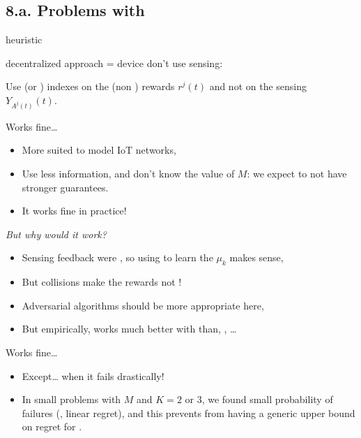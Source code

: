 \documentclass[12pt,english,ignorenonframetext,aspectratio=169,]{beamer}
\providecommand{\tightlist}{%
  \setlength{\itemsep}{0pt}\setlength{\parskip}{0pt}}
\begin{document}
\subsection{\hfill{}8.a. Problems with \Selfish\hfill{}}

\begin{frame}[allowframebreaks]{\Selfish{} heuristic}

\Selfish{} decentralized approach = device don't use sensing:

\begin{block}{\Selfish}
  Use \UCB{} (or \klUCB) indexes on the (non \iid) rewards \(r^j(t)\)
  and not on the sensing $Y_{A^j(t)}(t)$.
\end{block}

\begin{block}{Works fine\ldots{}}

\begin{itemize}
\tightlist
\item
  More suited to model IoT networks,
\item
  Use less information, and don't know the value of \(M\): we expect
  \Selfish{} to not have stronger guarantees.
\item
  It works fine in practice!
\end{itemize}

\end{block}

\begin{block}{\emph{But why would it work?}}

\begin{itemize}
\tightlist
\item
  Sensing feedback were \iid, so using \UCB{} to learn the \(\mu_k\) makes sense,
\item
  But collisions make the rewards not \iid{} !
\item
  Adversarial algorithms should be more appropriate here,
\item
  But empirically, \Selfish{} works much better with \klUCB{}
  than, \eg, \ExpThree\ldots{}
\end{itemize}

\end{block}

\begin{block}{Works fine\ldots{}}

\begin{itemize}
\tightlist
\item
  Except\ldots{} when it fails drastically! \Sadey[1.3]
\item
  In small problems with \(M\) and \(K = 2\) or \(3\), we found small
  probability of failures (\ie, linear regret), and this prevents from
  having a generic upper bound on regret for \Selfish.
\end{itemize}

\end{block}

\end{frame}
\end{document}
